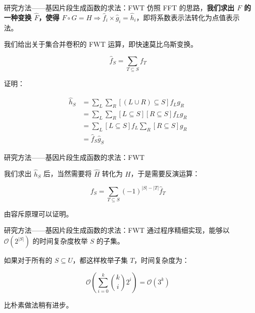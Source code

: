 \documentclass[10pt,aspectratio=43,mathserif]{ctexbeamer}
\begin{document}
	\begin{frame}{研究方法——基因片段生成函数的求法：FWT}
		仿照 FFT 的思路，\textbf{我们求出 $F$ 的一种变换 $\hat F$，使得 $F \circ G = H \Rightarrow \hat f_i \times \hat g_i = \hat h_i$}，即将系数表示法转化为点值表示法。
		
		我们给出关于集合并卷积的 FWT 运算，即快速莫比乌斯变换。
		
		$$\hat f_S=\sum_{T \subseteq S} f_T$$
		
		证明：
		
		$$
		\begin{aligned}
			\hat h_S &=\sum_{L} \sum_{R} [(L \cup R) \subseteq S] f_L g_R \\
			&= \sum_{L} \sum_{R} [L \subseteq S][R \subseteq S] f_L g_R \\
			&= \sum_{L} [L \subseteq S] f_L \sum_{R} [R \subseteq S] g_R \\
			&= \hat f_S \hat g_S
		\end{aligned}
		$$
	\end{frame}

	\begin{frame}{研究方法——基因片段生成函数的求法：FWT}
		
		我们求出 $\hat h_S$ 后，当然需要将 $\hat H$ 转化为 $H$，于是需要反演运算：
		
		$$f_S=\sum_{T \subseteq S} (-1)^{|S|-|T|}\hat f_T$$
		
		由容斥原理可以证明。
	\end{frame}

	\begin{frame}{研究方法——基因片段生成函数的求法：FWT}
		通过程序精细实现，能够以 $\mathcal O(2^{|S|})$ 的时间复杂度枚举 $S$ 的子集。
		
		如果对于所有的 $S \subseteq U$，都这样枚举子集 $T$，时间复杂度为：
		
		$$\mathcal O\left(\sum_{i=0}^k \binom{k}{i}2^i\right)= \mathcal O(3^k)$$
		
		比朴素做法稍有进步。
	\end{frame}
\end{document}
